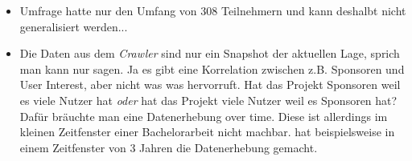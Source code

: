 \begin{itemize}
      \item Umfrage hatte nur den Umfang von 308 Teilnehmern und kann deshalbt nicht generalisiert werden... 
      \item Die Daten aus dem \textit{Crawler} sind nur ein Snapshot der aktuellen Lage, sprich man kann
            nur sagen. Ja es gibt eine Korrelation zwischen z.B. Sponsoren und User Interest, aber nicht was was hervorruft.
            Hat das Projekt Sponsoren weil es viele Nutzer hat \textit{oder} hat das Projekt viele Nutzer weil es Sponsoren hat?
            Dafür bräuchte man eine Datenerhebung over time.
            Diese ist allerdings im kleinen Zeitfenster einer Bachelorarbeit nicht machbar.
            \cite{midhaFactorsAffectingSuccess2012} hat beispielsweise in einem Zeitfenster von 3 Jahren die
            Datenerhebung gemacht. %
\end{itemize}





